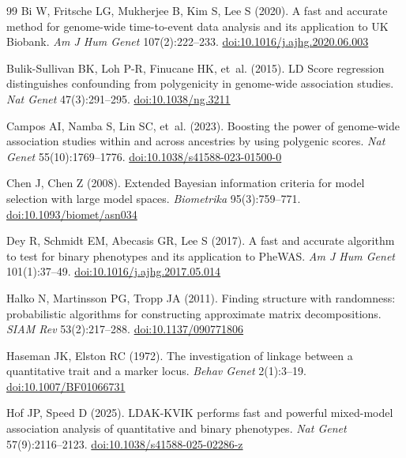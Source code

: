 \documentclass[11pt]{article}
\begin{document}
\begin{thebibliography}{99}
Bi W, Fritsche LG, Mukherjee B, Kim S, Lee S (2020). A fast and accurate
method for genome-wide time-to-event data analysis and its application to
UK Biobank. \emph{Am J Hum Genet} 107(2):222--233.
\href{https://doi.org/10.1016/j.ajhg.2020.06.003}{doi:10.1016/j.ajhg.2020.06.003}

Bulik-Sullivan BK, Loh P-R, Finucane HK, et~al. (2015). LD Score
regression distinguishes confounding from polygenicity in genome-wide
association studies. \emph{Nat Genet} 47(3):291--295.
\href{https://doi.org/10.1038/ng.3211}{doi:10.1038/ng.3211}

Campos AI, Namba S, Lin SC, et~al. (2023). Boosting the power of
genome-wide association studies within and across ancestries by using
polygenic scores. \emph{Nat Genet} 55(10):1769--1776.
\href{https://doi.org/10.1038/s41588-023-01500-0}{doi:10.1038/s41588-023-01500-0}

Chen J, Chen Z (2008). Extended Bayesian information criteria for model
selection with large model spaces. \emph{Biometrika} 95(3):759--771.
\href{https://doi.org/10.1093/biomet/asn034}{doi:10.1093/biomet/asn034}

Dey R, Schmidt EM, Abecasis GR, Lee S (2017). A fast and accurate
algorithm to test for binary phenotypes and its application to PheWAS.
\emph{Am J Hum Genet} 101(1):37--49.
\href{https://doi.org/10.1016/j.ajhg.2017.05.014}{doi:10.1016/j.ajhg.2017.05.014}

Halko N, Martinsson PG, Tropp JA (2011). Finding structure with
randomness: probabilistic algorithms for constructing approximate matrix
decompositions. \emph{SIAM Rev} 53(2):217--288.
\href{https://doi.org/10.1137/090771806}{doi:10.1137/090771806}

Haseman JK, Elston RC (1972). The investigation of linkage between a
quantitative trait and a marker locus. \emph{Behav Genet} 2(1):3--19.
\href{https://doi.org/10.1007/BF01066731}{doi:10.1007/BF01066731}

Hof JP, Speed D (2025). LDAK-KVIK performs fast and powerful mixed-model
association analysis of quantitative and binary phenotypes.
\emph{Nat Genet} 57(9):2116--2123.
\href{https://doi.org/10.1038/s41588-025-02286-z}{doi:10.1038/s41588-025-02286-z}


\end{thebibliography}
\end{document}
